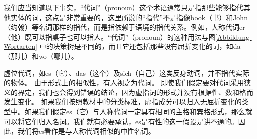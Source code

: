 我们应当知道以下事实，“代词”（pronoun）这个术语通常只是指那些能够指代其他实体的词，这点是非常重要的，这里所说的“指代”不是指像book（书）和John（约翰）等名词那样的指代，而是指依赖于语境的指代关系。例如，人称代词er（他）既可以指桌子也可以指人。“代词”（pronoun）的这种用法与图\ref{Abbildung-Wortarten}
中的决策树是不同的，而且它还包括那些没有屈折变化的词，如da（那儿）和wo（哪儿）。

虚位代词，如es（它）、das（这个）及sich（自己）这类反身动词，并不指代实际的物体。
由于形式上的相似性，有人视之为代词。
即使我们假定要对代词采用狭义的界定，我们也会得到错误的结论，因为虚指词的形式并没有根据性、数和格而发生变化。
如果我们按照教材中的分类标准，虚指成分可以归入无屈折变化的类型中。如果我们假定es（它）与人称代词一定具有相同的主格和宾格形式，那么就可以将它们归入名词。我们就有必要承认，es是有性的这一假设是讲不通的。因此，我们将es看作是与人称代词相似的中性名词。

